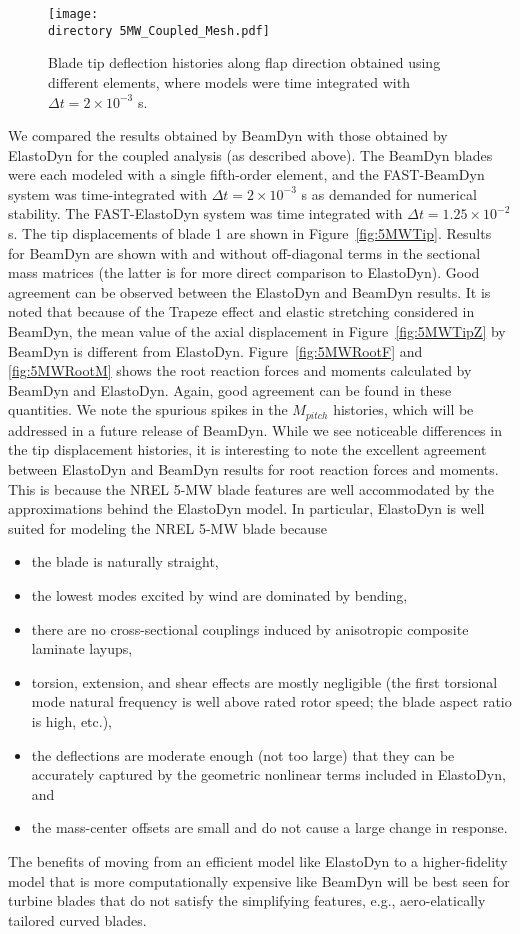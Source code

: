 \documentclass{aiaa-tc}
\def\directory{EPSF/}
\begin{document}
\begin{figure}
    \centering
\texttt{[image: \\directory  5MW\_Coupled\_Mesh.pdf]}
\caption{Blade tip deflection histories along flap direction obtained using different elements, where models were time integrated with $\Delta t = 2 \times 10^{-3}$ s.}
\label{fig:5MW_Coupled_Mesh}
\end{figure} 

We compared the results obtained by BeamDyn with those obtained by ElastoDyn for the coupled analysis (as described above).  The BeamDyn blades were each modeled with a single fifth-order element, and the FAST-BeamDyn system was time-integrated with $\Delta t = 2 \times 10^{-3}$ s as demanded for numerical stability.  
The FAST-ElastoDyn system was time integrated with $\Delta t = 1.25 \times 10^{-2}$ s.
The tip displacements of blade 1 are shown in Figure~\ref{fig:5MWTip}.  Results for BeamDyn are shown with and without off-diagonal terms in the sectional mass matrices (the latter is for more direct comparison to ElastoDyn).
Good agreement can be observed between the ElastoDyn and BeamDyn results. It is noted that because of the Trapeze effect and elastic stretching considered in BeamDyn, the mean value of the axial displacement in Figure~\ref{fig:5MWTipZ} by BeamDyn is different from ElastoDyn. Figure~\ref{fig:5MWRootF} and \ref{fig:5MWRootM} shows the root reaction forces and moments calculated by BeamDyn and ElastoDyn. Again, good agreement can be found in these quantities. We note the spurious spikes in the $M_{pitch}$ histories, which will be addressed in a future release of BeamDyn.  While we see noticeable differences in the tip displacement histories, it is interesting to note the excellent agreement between ElastoDyn and BeamDyn results for root reaction forces and moments.  This is because the NREL 5-MW blade features are well accommodated by the approximations behind the ElastoDyn model.  In particular, 
ElastoDyn is well suited for modeling the NREL 5-MW blade because
\begin{itemize}
\item the blade is naturally straight,
\item the lowest modes excited by wind are dominated by bending,
\item there are no cross-sectional couplings induced by anisotropic composite laminate layups,
\item torsion, extension, and shear effects are mostly negligible (the first torsional mode natural frequency is well above rated rotor speed; the blade aspect ratio is high, etc.),
\item the deflections are moderate enough (not too large) that they can be accurately captured by the geometric nonlinear terms included in ElastoDyn, and
\item the mass-center offsets are small and do not cause a large change in response.
\end{itemize}
The benefits of moving from an efficient model like ElastoDyn to a higher-fidelity model that is more computationally expensive like BeamDyn will be best seen for turbine blades that do not satisfy the simplifying features, e.g., aero-elatically tailored curved blades.\cite{Sri:SciTech2016}
\end{document}

